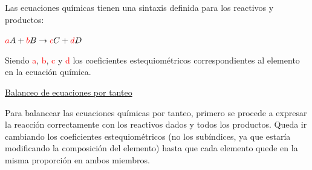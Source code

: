             \indent Las ecuaciones químicas tienen una sintaxis definida para los reactivos y productos:
            \begin{center}  \end{center}
            \begin{center}
                $\textcolor{red}{a}A + \textcolor{red}{b}B \rightarrow \textcolor{red}{c}C + \textcolor{red}{d}D$ \\
            \end{center}
            \indent Siendo \textcolor{red}{a}, \textcolor{red}{b}, \textcolor{red}{c} y \textcolor{red}{d} los coeficientes estequiométricos correspondientes al elemento en la ecuación química. \\[10pt]
        \saltoPag%
        \begin{center} \underline{Balanceo de ecuaciones por tanteo} \end{center}
            \indent Para balancear las ecuaciones químicas por tanteo, primero se procede a expresar la reacción correctamente con los reactivos dados y todos los productos. Queda ir cambiando los coeficientes estequiométricos (no los subíndices, ya que estaría modificando la composición del elemento) hasta que cada elemento quede en la misma proporción en ambos miembros. 
